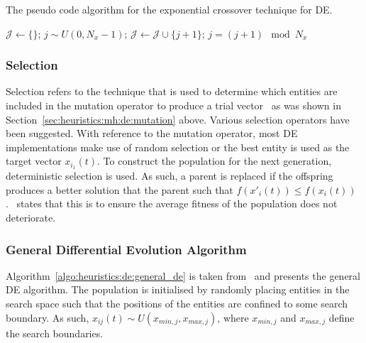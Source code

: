 \begin{algorithm}[H]
      \caption{The pseudo code algorithm for the exponential crossover technique for \ac{DE}.}
      \label{algo:heuristics:de:exp}
      \begin{algorithmic}
            \State $\mathcal{J} \gets \{\}$;
            \State $j \sim U(0,N_{x} - 1)$;
            \Repeat
            \State $\mathcal{J} \gets \mathcal{J} \cup \{j + 1 \}$;
            \State $j = (j+1) \mod N_{x}$
      \end{algorithmic}
\end{algorithm}

\subsubsection{Selection}
\label{sec:heuristics:mh:de:selection}

Selection refers to the technique that is used to determine which entities are included in the mutation operator to produce a trial vector~\cite{ref:engelbrecht:2007} as was shown in Section~\ref{sec:heuristics:mh:de:mutation} above. Various selection operators have been suggested. With reference to the mutation operator, most \ac{DE} implementations make use of random selection or the best entity is used as the target vector $x_{i_{1}}(t)$. To construct the population for the next generation, deterministic selection is used. As such, a parent is replaced if the offspring produces a better solution that the parent such that $f(x'_{i}(t)) \leq f(x_{i}(t))$.~\citeauthor{ref:engelbrecht:2007}\cite{ref:engelbrecht:2007} states that this is to ensure the average fitness of the population does not deteriorate.


\subsubsection{General Differential Evolution Algorithm}

Algorithm~\ref{algo:heuristics:de:general_de} is taken from~\cite{ref:engelbrecht:2007} and presents the general \ac{DE} algorithm. The population is initialised by randomly placing entities in the search space such that the positions of the entities are confined to some search boundary. As such, $x_{ij}(t) \sim U(x_{min,j}, x_{max,j})$, where $x_{min,j}$ and $x_{max,j}$ define the search boundaries.

